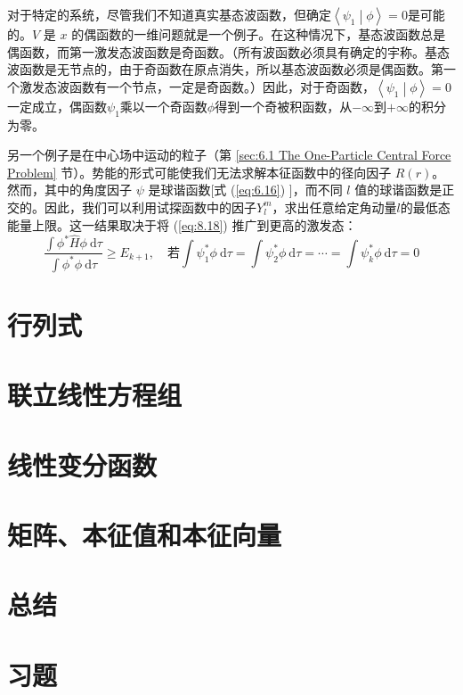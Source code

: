    对于特定的系统，尽管我们不知道真实基态波函数，但确定$\left\langle \psi_1 \middle| \phi \right\rangle = 0$是可能的。$V$ 是 $x$ 的偶函数的一维问题就是一个例子。在这种情况下，基态波函数总是偶函数，而第一激发态波函数是奇函数。（所有波函数必须具有确定的宇称。基态波函数是无节点的，由于奇函数在原点消失，所以基态波函数必须是偶函数。第一个激发态波函数有一个节点，一定是奇函数。）因此，对于奇函数，$\left\langle \psi_1 \middle| \phi \right\rangle = 0$一定成立，偶函数$\psi_1$乘以一个奇函数$\phi$得到一个奇被积函数，从$-\infty$到$+\infty$的积分为零。

    另一个例子是在中心场中运动的粒子（第 \ref{sec:6.1 The One-Particle Central Force Problem} 节）。势能的形式可能使我们无法求解本征函数中的径向因子 $R(r)$。然而，其中的角度因子 $\psi$ 是球谐函数[式 (\ref{eq:6.16}) ]，而不同 $l$ 值的球谐函数是正交的。因此，我们可以利用试探函数中的因子$Y_l^m$，求出任意给定角动量$l$的最低态能量上限。这一结果取决于将 (\ref{eq:8.18}) 推广到更高的激发态：
    \begin{equation}
        \frac{\int \phi^{\ast} \hat{H}\phi \:\mathrm{d}\tau}{\int \phi^{\ast} \phi \:\mathrm{d}\tau} \geq E_{k+1}, \quad \text{若} \int \psi_1^{\ast} \phi \: \mathrm{d}\tau = \int \psi_2^{\ast} \phi \:\mathrm{d}\tau = \cdots = \int \psi_k^{\ast} \phi \:\mathrm{d}\tau = 0
        \label{eq:8.19}
    \end{equation}












\section{行列式}
\label{sec:8.3 Determinants}

\section{联立线性方程组}
\label{sec:8.4 Simultaneous Linear Equations}

\section{线性变分函数}
\label{sec:8.5 Linear Variational Functions}

\section{矩阵、本征值和本征向量}
\label{sec:8.6 Matrices, Eigenvalues, and Eigenvectors}

\section*{总结}

\section*{习题}